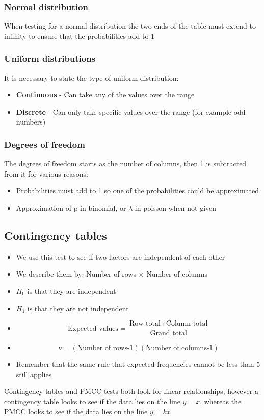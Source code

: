 \documentclass{article}[18pt]
\begin{document}
\subsubsection{Normal distribution}
When testing for a normal distribution the two ends of the table must extend to infinity to ensure that the probabilities add to 1
\subsubsection{Uniform distributions}
It is necessary to state the type of uniform distribution:
\begin{itemize}
\item \textbf{Continuous} - Can take any of the values over the range
\item \textbf{Discrete} - Can only take specific values over the range (for example odd numbers)
\end{itemize}
\subsubsection{Degrees of freedom}
The degrees of freedom starts as the number of columns, then 1 is subtracted from it for various reasons:
\begin{itemize}
\item Probabilities must add to 1 so one of the probabilities could be approximated
\item Approximation of p in binomial, or $\lambda$ in poisson when not given
\end{itemize}
\newpage
\subsection{Contingency tables}
\begin{itemize}
\item We use this test to see if two factors are independent of each other
\item We describe them by: Number of rows $\times$ Number of columns
\item $H_0$ is that they are independent
\item $H_1$ is that they are not independent
\item $$\textrm{Expected values}=\frac{\textrm{Row total}\times\textrm{Column total}}{\textrm{Grand total}}$$
\item $$\nu=(\textrm{Number of rows-1})(\textrm{Number of columns-1})$$
\item Remember that the same rule that expected frequencies cannot be less than 5 still applies
\end{itemize}
Contingency tables and PMCC tests both look for linear relationships, however a contingency table looks to see if the data lies on the line $y=x$, whereas the PMCC looks to see if the data lies on the line $y=kx$
\end{document}
